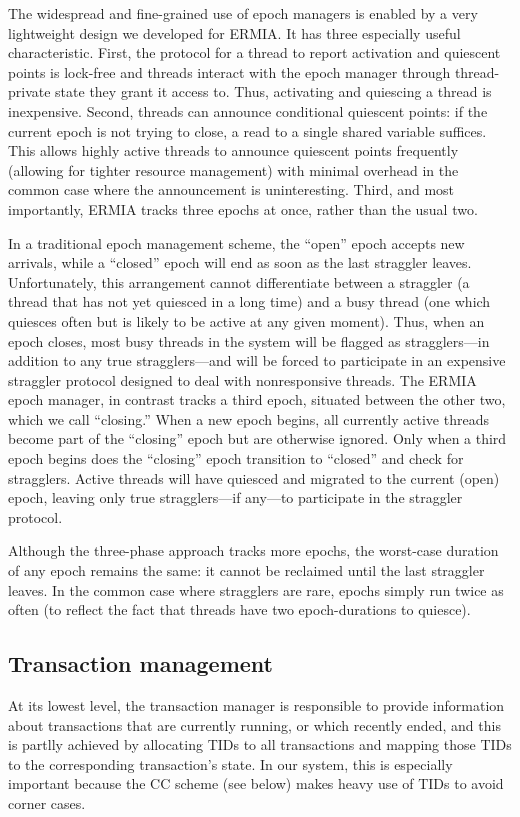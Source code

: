 The widespread and fine-grained use of epoch managers is enabled by a very lightweight design we developed for ERMIA. It has three especially useful characteristic. First, the protocol for a thread to report activation and quiescent points is lock-free and threads interact with the epoch manager through thread-private state they grant it access to. Thus, activating and quiescing a thread is inexpensive. Second, threads can announce conditional quiescent points: if the current epoch is not trying to close, a read to a single shared variable suffices. This allows highly active threads to announce quiescent points frequently (allowing for tighter resource management) with minimal overhead in the common case where the announcement is uninteresting. Third, and most importantly, ERMIA tracks three epochs at once, rather than the usual two.

In a traditional epoch management scheme, the ``open'' epoch accepts new arrivals, while a ``closed'' epoch will end as soon as the last straggler leaves. Unfortunately, this arrangement cannot differentiate between a straggler (a thread that has not yet quiesced in a long time) and a busy thread (one which quiesces often but is likely to be active at any given moment). Thus, when an epoch closes, most busy threads in the system will be flagged as stragglers---in addition to any true stragglers---and will be forced to participate in an expensive straggler protocol designed to deal with nonresponsive threads. The ERMIA epoch manager, in contrast tracks a third epoch, situated between the other two, which we call ``closing.'' When a new epoch begins, all currently active threads become part of the ``closing'' epoch but are otherwise ignored. Only when a third epoch begins does the ``closing'' epoch transition to ``closed'' and check for stragglers. Active threads will have quiesced and migrated to the current (open) epoch, leaving only true stragglers---if any---to participate in the straggler protocol.

Although the three-phase approach tracks more epochs, the worst-case duration of any epoch remains the same: it cannot be reclaimed until the last straggler leaves. In the common case where stragglers are rare, epochs simply run twice as often (to reflect the fact that threads have two epoch-durations to quiesce). 

\subsection{Transaction management}
At its lowest level, the transaction manager is responsible to provide information about transactions that are currently running, or which recently ended, and this is partlly achieved by allocating TIDs to all transactions and mapping those TIDs to the corresponding transaction's state. In our system, this is especially important because the CC scheme (see below) makes heavy use of TIDs to avoid corner cases.

